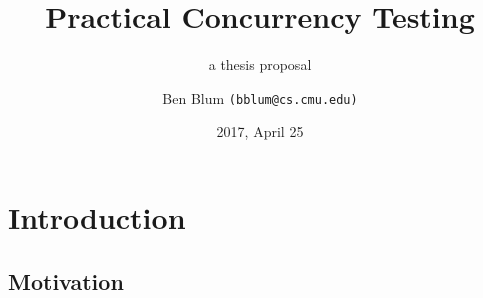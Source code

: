 \documentclass[xcolor=dvipsnames]{beamer}
\title[Thesis Proposal]{{\bf Practical Concurrency Testing}}
\subtitle[]{a thesis proposal}
\author[Ben Blum]{Ben Blum \texttt{(bblum@cs.cmu.edu)}}
\institute[CMU CSD]{Carnegie Mellon University}
\date[]{2017, April 25}
\begin{document}
\renewcommand{\inserttotalframenumber}{39}
\normalem
\begin{frame}
	\titlepage
\end{frame}


\newcommand\linegap{\vspace{0.2in}}
\newcommand\breakslide[1]{\begin{frame}{} \begin{center} #1 \end{center} \end{frame}}

\section{Introduction}
\subsection{Motivation}
\end{document}
